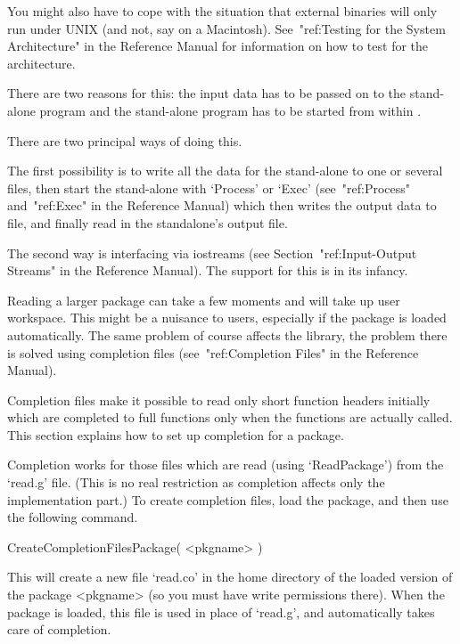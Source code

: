 You might also have to cope with the situation that external binaries will
only run under UNIX (and not, say on a Macintosh).
See~"ref:Testing for the System Architecture" in the {\GAP} Reference Manual
for information on how to test for the architecture.



There are two reasons for this: the input data has  to be passed on to
the stand-alone program and the  stand-alone program  has to be  started
from within {\GAP}.

There are two principal ways of doing this.

The first possibility is to write  all the data for the stand-alone to
one or  several files,  then start the  stand-alone with  `Process' or
`Exec'  (see~"ref:Process"  and~"ref:Exec"  in  the  {\GAP}  Reference
Manual) which then writes the output data to file, and finally read in
the standalone's output file.

The second way is interfacing via iostreams (see
Section~"ref:Input-Output Streams" in the {\GAP} Reference Manual).
The support for this is in its infancy.




Reading a larger package can take a few moments and will take up user
workspace.
This might be a nuisance to users, especially if the package is loaded
automatically.
The same problem of course affects the {\GAP} library,
the problem there is solved using completion files
(see~"ref:Completion Files" in the {\GAP} Reference Manual).

Completion files make it possible to read only short function headers
initially which are completed to full functions only when the functions are
actually called.
This section explains how to set up completion for a {\GAP} package.

Completion works for those files which are read (using `ReadPackage')
from the `read.g' file. (This is no real restriction as completion affects
only the implementation part.)
To create completion files, load the {\GAP} package,
and then use the following command.

\>CreateCompletionFilesPackage( <pkgname> )

This will create a new file `read.co' in the home directory of the
loaded version of the {\GAP} package <pkgname>
(so you must have write permissions there).
When the {\GAP} package is loaded, this file is used in place of `read.g',
and automatically takes care of completion.

